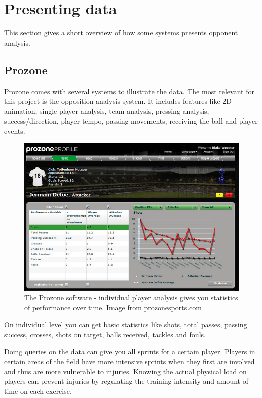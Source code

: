 \section{Presenting data}

This section gives a short overview of how some systems presents opponent analysis.

\subsection{Prozone}

Prozone comes with several systems to illustrate the data. The most relevant for this project is the opposition analysis system. It includes features like 2D animation, single player analysis, team analysis, pressing analysis, success/direction, player tempo, passing movements, receiving the ball and player events.

\begin{figure}[ht!]
\centering
\includegraphics[width=1\textwidth]{images/general/prozonestats.png}
\caption{The Prozone software - individual player analysis gives you statistics of performance over time. Image from prozonesports.com}
\label{overflow}
\end{figure}

On individual level you can get basic statistics like shots, total passes, passing success, crosses, shots on target, balls received, tackles and fouls. 

Doing queries on the data can give you all sprints for a certain player. Players in certain areas of the field have more intensive sprints when they first are involved and thus are more vulnerable to injuries. Knowing the actual physical load on players can prevent injuries by regulating the training intensity and amount of time on each exercise. 

